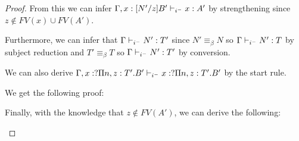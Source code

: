 \begin{proof}
From this we can infer $\Gamma, x : [N'/z]B' \judgeCI x : A'$
by strengthening since $z \notin FV(x)\cup FV(A')$.

Furthermore, we can infer that $\Gamma \judgeCI N' : T'$ since $N' \equiv_{\beta} N$ 
so $\Gamma \judgeCI N' : T$ by subject reduction and $T' \equiv_{\beta} T$ so $\Gamma \judgeCI N' : T'$
by conversion.

We can also derive $\Gamma, x : ?\Pi n,z : T' . B' \judgeCI x : ?\Pi n,z : T' . B'$ by the start rule. 

We get the following proof:

\begin{prooftree}
\end{prooftree}

Finally, with the knowledge that $z\notin FV(A')$, we can derive the following:

\begin{prooftree}
\end{prooftree}

\end{proof}
